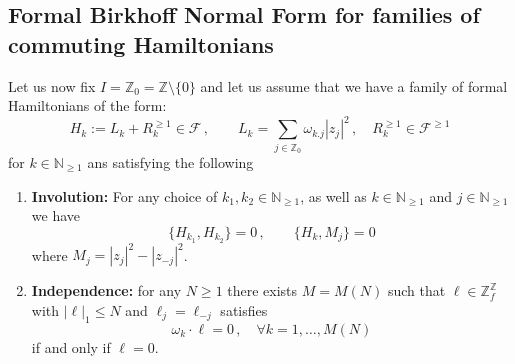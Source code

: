 \documentclass[reqno,11pt]{amsart}
\theoremstyle{plain}
\numberwithin{equation}{section}
\newcommand{\N}{\mathbb{N}}
\newcommand{\Z}{\mathbb{Z}}
\newcommand{\cF}{{\mathcal F}}
\newcommand{\s}{\sigma}
\begin{document}
{\subsection{Formal Birkhoff Normal Form for families of commuting Hamiltonians}	Let us  now fix $I=\Z_0=\Z\setminus\{0\}$ and let us assume that we have a family of  formal Hamiltonians of the form:
\[ 
H_k:= L_k+ R_k^{\geq 1}\in\cF \,,\qquad L_k = \sum_{j\in \Z_0} \omega_{k.j}|z_j|^2\,,\quad R_k^{\geq 1}\in \cF^{\geq 1}
\]
for $k\in \N_{\geq 1}$ ans satisfying the following


\begin{enumerate}
	\item[H1.] {\bf Involution:} For any choice of $k_1,k_2\in \N_{\geq1}$, as well as  $k\in \N_{\geq1}$ and $j\in \N_{\geq1}$ we have
	\[
	\{H_{k_1},H_{k_2}\}=0\,,\qquad \{H_k, M_j\}=0
	\]
	where  $M_j =|z_j|^2- |z_{-j}|^2$.
	\item[H2.]{\bf Independence:} 	for any $N\geq 1$  there exists $M=M(N)$ such that  $\ell\in \Z^\Z_f$ with $|\ell|_1\leq  N$  and $\ell_j=\ell_{-j}$
	satisfies 
	\begin{equation}\label{resonance}
		\omega_k\cdot \ell =0 \,,\quad \forall k=1,\dots, M(N)
	\end{equation} if and only if $\ell=0$.
\end{enumerate}




}
\end{document}
